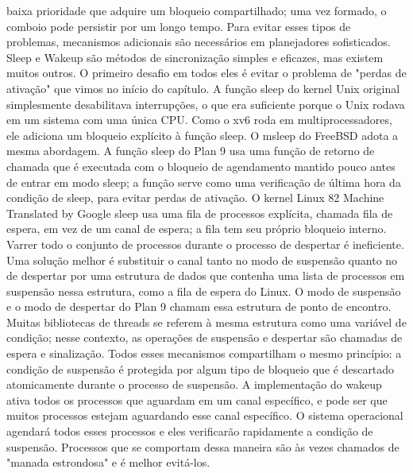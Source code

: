 baixa  prioridade  que  adquire  um  bloqueio  compartilhado;  uma  vez  formado,  o  comboio  pode  persistir  por  um  longo  
tempo.  Para  evitar  esses  tipos  de  problemas,  mecanismos  adicionais  são  necessários  em  planejadores  sofisticados.
 Sleep  e  Wakeup  são  métodos  de  sincronização  simples  e  eficazes,  mas  existem  muitos  outros.  O  primeiro  
desafio  em  todos  eles  é  evitar  o  problema  de  "perdas  de  ativação"  que  vimos  no  início  do  capítulo.  A  função  sleep  
do  kernel  Unix  original  simplesmente  desabilitava  interrupções,  o  que  era  suficiente  porque  o  Unix  rodava  em  um  
sistema  com  uma  única  CPU.  Como  o  xv6  roda  em  multiprocessadores,  ele  adiciona  um  bloqueio  explícito  à  
função  sleep.  O  msleep  do  FreeBSD  adota  a  mesma  abordagem.  A  função  sleep  do  Plan  9  usa  uma  função  de  
retorno  de  chamada  que  é  executada  com  o  bloqueio  de  agendamento  mantido  pouco  antes  de  entrar  em  modo  
sleep;  a  função  serve  como  uma  verificação  de  última  hora  da  condição  de  sleep,  para  evitar  perdas  de  ativação.  O  kernel  Linux
 82
Machine Translated by Google
 sleep  usa  uma  fila  de  processos  explícita,  chamada  fila  de  espera,  em  vez  de  um  canal  de  espera;  a  fila  tem  seu  
próprio  bloqueio  interno.
 Varrer  todo  o  conjunto  de  processos  durante  o  processo  de  despertar  é  ineficiente.  Uma  solução  melhor  é  substituir  o  canal  
tanto  no  modo  de  suspensão  quanto  no  de  despertar  por  uma  estrutura  de  dados  que  contenha  uma  lista  de  processos  em  
suspensão  nessa  estrutura,  como  a  fila  de  espera  do  Linux.  O  modo  de  suspensão  e  o  modo  de  despertar  do  Plan  9  chamam  essa  
estrutura  de  ponto  de  encontro.  Muitas  bibliotecas  de  threads  se  referem  à  mesma  estrutura  como  uma  variável  de  condição;  
nesse  contexto,  as  operações  de  suspensão  e  despertar  são  chamadas  de  espera  e  sinalização.  Todos  esses  mecanismos  
compartilham  o  mesmo  princípio:  a  condição  de  suspensão  é  protegida  por  algum  tipo  de  bloqueio  que  é  descartado  atomicamente  
durante  o  processo  de  suspensão.
 A  implementação  do  wakeup  ativa  todos  os  processos  que  aguardam  em  um  canal  específico,  e  pode  ser  que  muitos  
processos  estejam  aguardando  esse  canal  específico.  O  sistema  operacional  agendará  todos  esses  processos  e  eles  verificarão  
rapidamente  a  condição  de  suspensão.
 Processos  que  se  comportam  dessa  maneira  são  às  vezes  chamados  de  "manada  estrondosa"  e  é  melhor  evitá-los.
